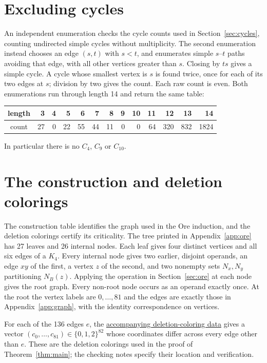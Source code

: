 \documentclass[11pt]{article}
\begin{document}
\begin{appendices}
\section{Excluding cycles}\label{app:cycles}
An independent enumeration checks the cycle counts used in
Section~\ref{sec:cycles}, counting undirected simple cycles without multiplicity.
The second enumeration instead chooses an edge $(s,t)$ with $s<t$, and
enumerates simple $s$--$t$ paths avoiding that edge, with all other vertices
greater than $s$. Closing by $ts$ gives a simple cycle. A cycle whose
smallest vertex is $s$ is found twice, once for each of its two edges at
$s$; division by two gives the count. Each raw count is even. Both enumerations run through length 14 and
return the same table:
\begin{center}\small
\begin{tabular}{c|rrrrrrrrrrrr}
length&3&4&5&6&7&8&9&10&11&12&13&14\\\hline
count&27&0&22&55&44&11&0&0&64&320&832&1824
\end{tabular}
\end{center}
In particular there is no $C_4$, $C_9$ or $C_{10}$.

\section{The construction and deletion colorings}\label{app:decomposition}
The construction table identifies the graph used in the Ore induction,
and the deletion colorings certify its criticality.
The tree printed in Appendix~\ref{app:ore} has 27 leaves and 26 internal
nodes. Each leaf gives four distinct vertices and all six edges of a
$K_4$. Every internal node gives two earlier, disjoint operands, an edge
$xy$ of the first, a vertex $z$ of the second, and two nonempty sets
$N_x,N_y$ partitioning $N_B(z)$. Applying the operation in
Section~\ref{sec:ore} at each node gives the root graph. Every non-root
node occurs as an operand exactly once. At the root the vertex labels
are $0,\ldots,81$ and the edges are exactly those in Appendix~\ref{app:graph},
with the identity correspondence on vertices.

For each of the 136 edges $e$, the
\href{https://raw.githubusercontent.com/6/clank-lab/main/results/steinberg-c4-c9/data/deletion-colorings.json}{accompanying deletion-coloring data}
gives a vector
$(c_0,\ldots,c_{81})\in\{0,1,2\}^{82}$ whose coordinates differ across
every edge other than $e$. These are the deletion colorings used in the
proof of Theorem~\ref{thm:main}; the checking notes specify their location
and verification.

\end{appendices}
\end{document}
